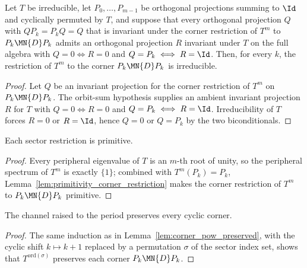 \begin{lemma}
    \label{lem:corner_restriction_irreducible}
    \leanok
    Let $T$ be irreducible, let $P_0,\ldots,P_{m-1}$ be orthogonal
    projections summing to $\Id$ and cyclically permuted by $T$, and
    suppose that every orthogonal projection $Q$ with $QP_k=P_kQ=Q$ that
    is invariant under the corner restriction of $T^m$ to $P_k\MN{D}P_k$
    admits an orthogonal projection $R$ invariant under $T$ on the full
    algebra with $Q=0\iff R=0$ and $Q=P_k\iff R=\Id$. Then, for every $k$,
    the restriction of $T^m$ to the corner $P_k\MN{D}P_k$ is irreducible.
\end{lemma}

\begin{proof}\leanok
    Let $Q$ be an invariant projection for the corner restriction of $T^m$
    on $P_k\MN{D}P_k$. The orbit-sum hypothesis supplies an ambient
    invariant projection $R$ for $T$ with $Q=0\iff R=0$ and
    $Q=P_k\iff R=\Id$. Irreducibility of $T$ forces $R=0$ or $R=\Id$, hence
    $Q=0$ or $Q=P_k$ by the two biconditionals.
\end{proof}

\begin{lemma}
    \label{lem:corner_restriction_primitive}
    \leanok
    Each sector restriction is primitive.
\end{lemma}

\begin{proof}\leanok
    Every peripheral eigenvalue of $T$ is an $m$-th root of unity, so the
    peripheral spectrum of $T^m$ is exactly $\{1\}$; combined with
    $T^m(P_k)=P_k$, Lemma~\ref{lem:primitivity_corner_restriction} makes the
    corner restriction of $T^m$ to $P_k\MN{D}P_k$ primitive.
\end{proof}

\begin{lemma}
    \label{lem:corner_invariance_perm}
    \leanok
    The channel raised to the period preserves every cyclic corner.
\end{lemma}

\begin{proof}\leanok
    The same induction as in Lemma~\ref{lem:corner_pow_preserved}, with the
    cyclic shift $k\mapsto k+1$ replaced by a permutation $\sigma$ of the
    sector index set, shows that $T^{\mathrm{ord}(\sigma)}$ preserves each
    corner $P_k\MN{D}P_k$.
\end{proof}

